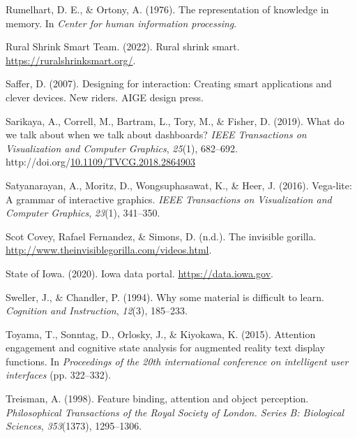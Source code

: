 \documentclass[print]{nuthesis}
\newlength{\cslhangindent}
\newenvironment{CSLReferences}[2]%
{\setlength{\parindent}{0pt}%
\everypar{\setlength{\hangindent}{\cslhangindent}}\ignorespaces}%
{\par}
\begin{document}
\begin{CSLReferences}{1}{0}
\leavevmode{}%
Rumelhart, D. E., \& Ortony, A. (1976). The representation of knowledge in memory. In \emph{Center for human information processing}.

\leavevmode{}%
Rural Shrink Smart Team. (2022). Rural shrink smart. \url{https://ruralshrinksmart.org/}.

\leavevmode{}%
Saffer, D. (2007). Designing for interaction: Creating smart applications and clever devices. New riders. AIGE design press.

\leavevmode{}%
Sarikaya, A., Correll, M., Bartram, L., Tory, M., \& Fisher, D. (2019). What do we talk about when we talk about dashboards? \emph{IEEE Transactions on Visualization and Computer Graphics}, \emph{25}(1), 682--692. http://doi.org/\href{https://doi.org/10.1109/TVCG.2018.2864903}{10.1109/TVCG.2018.2864903}

\leavevmode{}%
Satyanarayan, A., Moritz, D., Wongsuphasawat, K., \& Heer, J. (2016). Vega-lite: A grammar of interactive graphics. \emph{IEEE Transactions on Visualization and Computer Graphics}, \emph{23}(1), 341--350.

\leavevmode{}%
Scot Covey, Rafael Fernandez, \& Simons, D. (n.d.). The invisible gorilla. \url{http://www.theinvisiblegorilla.com/videos.html}.

\leavevmode{}%
State of Iowa. (2020). Iowa data portal. \url{https://data.iowa.gov}.

\leavevmode{}%
Sweller, J., \& Chandler, P. (1994). Why some material is difficult to learn. \emph{Cognition and Instruction}, \emph{12}(3), 185--233.

\leavevmode{}%
Toyama, T., Sonntag, D., Orlosky, J., \& Kiyokawa, K. (2015). Attention engagement and cognitive state analysis for augmented reality text display functions. In \emph{Proceedings of the 20th international conference on intelligent user interfaces} (pp. 322--332).

\leavevmode{}%
Treisman, A. (1998). Feature binding, attention and object perception. \emph{Philosophical Transactions of the Royal Society of London. Series B: Biological Sciences}, \emph{353}(1373), 1295--1306.


\end{CSLReferences}
\end{document}
